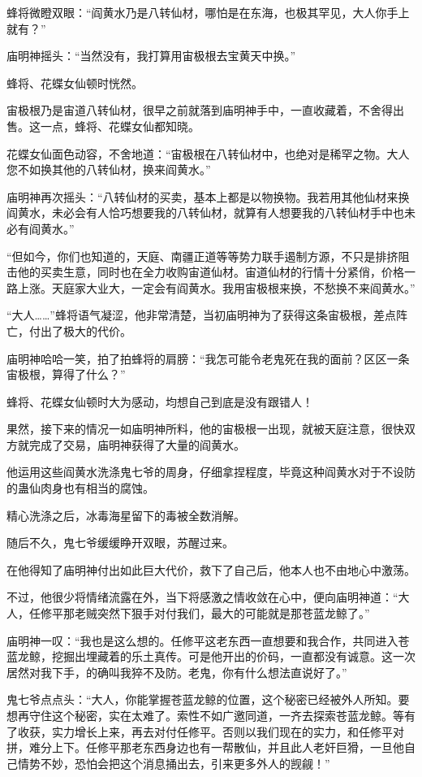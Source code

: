 \begin{this_body}
蜂将微瞪双眼：“阎黄水乃是八转仙材，哪怕是在东海，也极其罕见，大人你手上就有？”

庙明神摇头：“当然没有，我打算用宙极根去宝黄天中换。”

蜂将、花蝶女仙顿时恍然。

宙极根乃是宙道八转仙材，很早之前就落到庙明神手中，一直收藏着，不舍得出售。这一点，蜂将、花蝶女仙都知晓。

花蝶女仙面色动容，不舍地道：“宙极根在八转仙材中，也绝对是稀罕之物。大人您不如换其他的八转仙材，换来阎黄水。”

庙明神再次摇头：“八转仙材的买卖，基本上都是以物换物。我若用其他仙材来换阎黄水，未必会有人恰巧想要我的八转仙材，就算有人想要我的八转仙材手中也未必有阎黄水。”

“但如今，你们也知道的，天庭、南疆正道等等势力联手遏制方源，不只是排挤阻击他的买卖生意，同时也在全力收购宙道仙材。宙道仙材的行情十分紧俏，价格一路上涨。天庭家大业大，一定会有阎黄水。我用宙极根来换，不愁换不来阎黄水。”

“大人……”蜂将语气凝涩，他非常清楚，当初庙明神为了获得这条宙极根，差点阵亡，付出了极大的代价。

庙明神哈哈一笑，拍了拍蜂将的肩膀：“我怎可能令老鬼死在我的面前？区区一条宙极根，算得了什么？”

蜂将、花蝶女仙顿时大为感动，均想自己到底是没有跟错人！

果然，接下来的情况一如庙明神所料，他的宙极根一出现，就被天庭注意，很快双方就完成了交易，庙明神获得了大量的阎黄水。

他运用这些阎黄水洗涤鬼七爷的周身，仔细拿捏程度，毕竟这种阎黄水对于不设防的蛊仙肉身也有相当的腐蚀。

精心洗涤之后，冰毒海星留下的毒被全数消解。

随后不久，鬼七爷缓缓睁开双眼，苏醒过来。

在他得知了庙明神付出如此巨大代价，救下了自己后，他本人也不由地心中激荡。

不过，他很少将情绪流露在外，当下将感激之情收敛在心中，便向庙明神道：“大人，任修平那老贼突然下狠手对付我们，最大的可能就是那苍蓝龙鲸了。”

庙明神一叹：“我也是这么想的。任修平这老东西一直想要和我合作，共同进入苍蓝龙鲸，挖掘出埋藏着的乐土真传。可是他开出的价码，一直都没有诚意。这一次居然对我下手，的确叫我猝不及防。老鬼，你有什么想法直说好了。”

鬼七爷点点头：“大人，你能掌握苍蓝龙鲸的位置，这个秘密已经被外人所知。要想再守住这个秘密，实在太难了。索性不如广邀同道，一齐去探索苍蓝龙鲸。等有了收获，实力增长上来，再去对付任修平。否则以我们现在的实力，和任修平对拼，难分上下。任修平那老东西身边也有一帮散仙，并且此人老奸巨猾，一旦他自己情势不妙，恐怕会把这个消息捅出去，引来更多外人的觊觎！”


\end{this_body}
